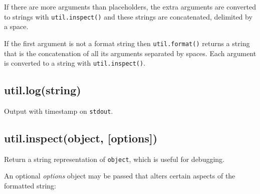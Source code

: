 If there are more arguments than placeholders, the extra arguments are
converted to strings with \texttt{util.inspect()} and these strings are
concatenated, delimited by a space.

\begin{Shaded}
\end{Shaded}

If the first argument is not a format string then \texttt{util.format()}
returns a string that is the concatenation of all its arguments
separated by spaces. Each argument is converted to a string with
\texttt{util.inspect()}.

\begin{Shaded}
\begin{Highlighting}[]
\NormalTok{(}\NormalTok{, }\NormalTok{, }\NormalTok{); }
\end{Highlighting}
\end{Shaded}

\subsection{util.log(string)}

Output with timestamp on \texttt{stdout}.

\begin{Shaded}
\begin{Highlighting}[]
\NormalTok{(}\NormalTok{);}
\end{Highlighting}
\end{Shaded}

\subsection{util.inspect(object, {[}options{]})}

Return a string representation of \texttt{object}, which is useful for
debugging.

An optional \emph{options} object may be passed that alters certain
aspects of the formatted string:

